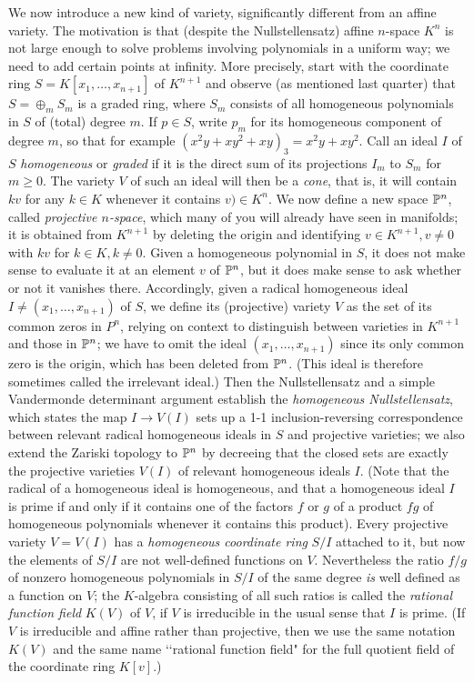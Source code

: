 We now introduce a new kind of variety, significantly different from an affine variety.  The motivation is that (despite the Nullstellensatz) affine $n$-space $K^n$ is not large enough to solve problems involving polynomials in a uniform way; we need to add certain points at infinity.  More precisely, start with the coordinate ring $S = K[x_1,\ldots,x_{n+1}]$ of $K^{n+1}$ and observe (as mentioned last quarter) that $S = \oplus_m S_m$ is a graded ring, where $S_m$ consists of all homogeneous polynomials in $S$ of (total) degree $m$.  If $p\in S$, write $p_m$ for its homogeneous component of degree $m$, so that for example $(x^2 y + x y^2 + xy)_3 = x^2 y + x y^2$.  Call an ideal $I$ of $S$ {\sl homogeneous} or {\sl graded} if it is the direct sum of its projections $I_m$ to $S_m$ for $m\ge0$.  The variety $V$ of such an ideal will then be a {\sl cone}, that is, it will contain $kv$ for any $k\in K$ whenever it contains $v)\in K^n$.  We now define a new space $\Bbb P^n$, called {\sl projective $n$-space}, which many of you will already have seen in manifolds; it is obtained from $K^{n+1}$ by deleting the origin and identifying $v\in K^{n+1},v\ne0$ with $kv$ for $k\in K,k\ne0$.  Given a homogeneous polynomial in $S$, it does not make sense to evaluate it at an element $v$ of $\Bbb P^n$, but it does make sense to ask whether or not it vanishes there.  Accordingly, given a radical homogeneous ideal $I\ne(x_1,\ldots,x_{n+1})$ of $S$, we define its (projective) variety $V$ as the set of its common zeros in $P^n$, relying on context to distinguish between varieties in $K^{n+1}$ and those in $\Bbb P^n$; we have to omit the ideal $(x_1,\ldots,x_{n+1})$ since its only common zero is the origin, which has been deleted from $\Bbb P^n$.  (This ideal is therefore sometimes called the irrelevant ideal.)  Then the Nullstellensatz and a simple Vandermonde determinant argument establish the {\sl homogeneous Nullstellensatz}, which states the map $I\rightarrow V(I)$ sets up a 1-1 inclusion-reversing correspondence between relevant radical homogeneous ideals in $S$ and projective varieties; we also extend the Zariski topology to $\Bbb P^n$ by decreeing that the closed sets are exactly the projective varieties $V(I)$ of relevant homogeneous ideals $I$.  (Note that the radical of a homogeneous ideal is homogeneous, and that a homogeneous ideal $I$ is prime if and only if it contains one of the factors $f$ or $g$ of a product $fg$ of homogeneous polynomials whenever it contains this product).  Every projective variety $V=V(I)$ has a {\sl homogeneous coordinate ring} $S/I$ attached to it, but now the elements of $S/I$ are not well-defined functions on $V$.  Nevertheless the ratio $f/g$ of nonzero homogeneous polynomials in $S/I$ of the same degree {\sl is} well defined as a function on $V$; the $K$-algebra consisting of all such ratios is called the {\sl rational function field} $K(V)$ of $V$, if $V$ is irreducible in the usual sense that $I$ is prime.  (If $V$ is irreducible and affine rather than projective, then we use the same notation $K(V)$ and the same name \lq\lq rational function field" for the full quotient field of the coordinate ring $K[v]$.)

